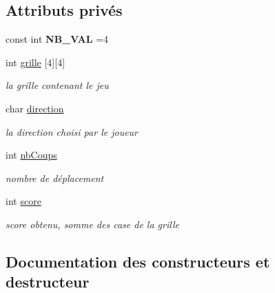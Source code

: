 \subsection*{Attributs privés}
\begin{DoxyCompactItemize}
\item 
\mbox{\label{class_jeu2048_a96d35735203bb9ceba62145bde867e92}} 
const int {\bfseries N\+B\+\_\+\+V\+AL} =4
\item 
\mbox{\label{class_jeu2048_a43744f4cf10aaf3dbc08b1fc2042a5c8}} 
int \hyperlink{class_jeu2048_a43744f4cf10aaf3dbc08b1fc2042a5c8}{grille} \mbox{[}4\mbox{]}\mbox{[}4\mbox{]}
\begin{DoxyCompactList}\small\item\em la grille contenant le jeu \end{DoxyCompactList}\item 
\mbox{\label{class_jeu2048_a667bfa0952227608fdc5099950e206c0}} 
char \hyperlink{class_jeu2048_a667bfa0952227608fdc5099950e206c0}{direction}
\begin{DoxyCompactList}\small\item\em la direction choisi par le joueur \end{DoxyCompactList}\item 
\mbox{\label{class_jeu2048_ae2e70724269cad929e1067dff97ea82c}} 
int \hyperlink{class_jeu2048_ae2e70724269cad929e1067dff97ea82c}{nb\+Coups}
\begin{DoxyCompactList}\small\item\em nombre de déplacement \end{DoxyCompactList}\item 
\mbox{\label{class_jeu2048_a559db2f159b10e7ee58968877d4e2849}} 
int \hyperlink{class_jeu2048_a559db2f159b10e7ee58968877d4e2849}{score}
\begin{DoxyCompactList}\small\item\em score obtenu, somme des case de la grille \end{DoxyCompactList}\end{DoxyCompactItemize}


\subsection{Documentation des constructeurs et destructeur}
\mbox{\label{class_jeu2048_a851bd5ce17939b16a6a3182b09866b73}} 
